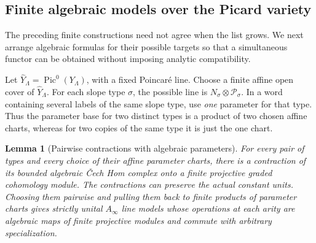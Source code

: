\documentclass[11pt]{article}
\newtheorem{lemma}[theorem]{Lemma}
\theoremstyle{definition}
\theoremstyle{remark}
\newcommand{\Ainf}{A_\infty}
\DeclareMathOperator{\Pic}{Pic}
\numberwithin{equation}{section}
\begin{document}
\subsection{Finite algebraic models over the Picard variety}

The preceding finite constructions need not agree when the list
grows.  We next arrange algebraic formulas for their possible targets
so that a simultaneous functor can be obtained without imposing
analytic compatibility.

Let $\widehat Y_\Lambda=\Pic^0(Y_\Lambda)$, with a fixed Poincar\'e
line.  Choose a finite affine open cover of $\widehat Y_\Lambda$.
For each slope type $\sigma$, the possible line is
$N_\sigma\otimes\mathcal P_\sigma$.  In a word containing several
labels of the same slope type, use \emph{one} parameter for that type.
Thus the parameter base for two distinct types is a product of two
chosen affine charts, whereas for two copies of the same type it is
just the one chart.

\begin{lemma}[Pairwise contractions with algebraic parameters]
\label{mirror:parameter-model}
For every pair of types and every choice of their affine parameter
charts, there is a contraction of its bounded algebraic \v Cech Hom
complex onto a finite projective graded cohomology module.  The
contractions can preserve the actual constant units.  Choosing them
pairwise and pulling them back to finite products of parameter
charts gives strictly unital $\Ainf$ line models whose operations at
each arity are algebraic maps of finite projective modules and
commute with arbitrary specialization.
\end{lemma}
\end{document}
